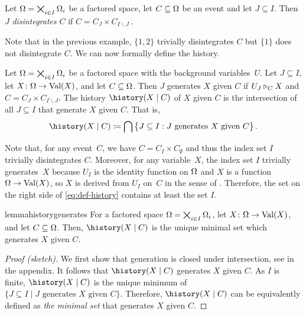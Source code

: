 \documentclass[USenglish,onecolumn]{article}
\begin{document}
\begin{definition}[Disintegration]\label{def:disintegration}
Let $\Omega=\bigtimes_{i\in I}\Omega_i$ be a factored space, let $C\subseteq\Omega$ be an event and let $J\subseteq I$. Then $J$ \emph{disintegrates} $C$ if
    $C=C_J\times C_{I\backslash J}\,.$
\end{definition}
Note that in the previous example, $\{1,2\}$ trivially disintegrates $C$ but $\{1\}$ does not disintegrate $C$. We can now formally define the history.
%
\begin{definition}
\label{def:history}
Let $\Omega=\bigtimes_{i\in I}\Omega_i$ be a factored space with the background variables~$U$. Let $J\subseteq I$, let $X\colon \Omega\to \textnormal{Val}(X)$, and let $C\subseteq \Omega$. Then $J$ \textnormal{generates} $X$ given $C$ if $U_J \triangleright_{C} X$ and $C=C_J\times C_{I\backslash J}$.
The \textnormal{history} $\history(X\mid C)$ of $X$ given $C$ is the intersection of all $J\subseteq I$ %
that generate $X$ given $C$. That is,
\begin{align}\label{eq:def-history}%
\history(X\mid C)\coloneqq \sectbig \big\{J \subseteq I: J  \textnormal{ generates } X \textnormal{ given } C\big\}\,.
\end{align}
\end{definition}

Note that, for any event~$C$, we have $C=C_I\times C_\emptyset$ and thus the index set $I$ trivially disintegrates $C$. Moreover, for any variable~$X$, the index set $I$ trivially generates~$X$ because $U_I$ is the identity function on $\Omega$ and $X$ is a function $\Omega\to\textnormal{Val}(X)$, so $X$ is derived from $U_I$ on~$C$ in the sense of . Therefore, the set on the right side of \eqref{eq:def-history} contains at least the set $I$.

\begin{restatable}{lemma}{historygenerates}
    \label{lemma:historygenerates}
    For a factored space $\Omega=\bigtimes_{i\in I}\Omega_i$, let $X\colon \Omega\to \textnormal{Val}(X)$, and let $C\subseteq\Omega$. Then, $\history(X\given C)$ is the unique minimal set which generates $X$ given $C$.
\end{restatable}
\begin{proof}[Proof (sketch)]
    We first show that generation is closed under intersection, see  in the appendix.
    It follows that $\history(X\given C)$ generates $X$ given $C$. As $I$ is finite, $\history(X\given C)$ is the unique minimum of $\{J\subseteq I \mid J\text{ generates } X\text{ given }C\}$. Therefore, $\history(X\given C)$ can be equivalently defined as \emph{the minimal set} that generates $X$ given $C$.
\end{proof}
\end{document}
